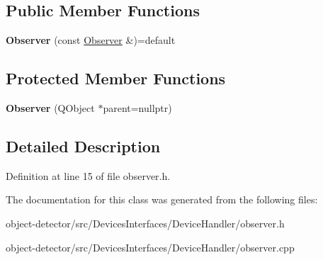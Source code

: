 \subsection*{Public Member Functions}
\begin{DoxyCompactItemize}
\item 
\mbox{\label{class_devices_1_1_observer_a749229c39b82fb5c5ece5eaa4f4be4bc}} 
{\bfseries Observer} (const \hyperlink{class_devices_1_1_observer}{Observer} \&)=default
\end{DoxyCompactItemize}
\subsection*{Protected Member Functions}
\begin{DoxyCompactItemize}
\item 
\mbox{\label{class_devices_1_1_observer_a535c8656871306792a63d03c0eda96c8}} 
{\bfseries Observer} (Q\+Object $\ast$parent=nullptr)
\end{DoxyCompactItemize}


\subsection{Detailed Description}


Definition at line 15 of file observer.\+h.



The documentation for this class was generated from the following files\+:\begin{DoxyCompactItemize}
\item 
object-\/detector/src/\+Devices\+Interfaces/\+Device\+Handler/observer.\+h\item 
object-\/detector/src/\+Devices\+Interfaces/\+Device\+Handler/observer.\+cpp\end{DoxyCompactItemize}

